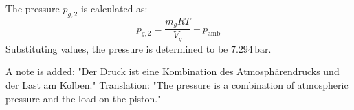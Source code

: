 The pressure \( p_{g,2} \) is calculated as:  
\[
p_{g,2} = \frac{m_g R T}{V_g} + p_{\text{amb}}
\]  
Substituting values, the pressure is determined to be \( 7.294 \, \text{bar} \).  

A note is added:  
"Der Druck ist eine Kombination des Atmosphärendrucks und der Last am Kolben."  
Translation: "The pressure is a combination of atmospheric pressure and the load on the piston."